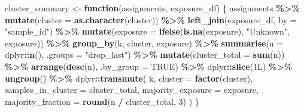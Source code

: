 \documentclass[
]{article}
\newenvironment{Shaded}{\begin{snugshade}}{\end{snugshade}}
\newcommand{\AttributeTok}[1]{\textcolor[rgb]{0.13,0.29,0.53}{#1}}
\newcommand{\ConstantTok}[1]{\textcolor[rgb]{0.56,0.35,0.01}{#1}}
\newcommand{\ControlFlowTok}[1]{\textcolor[rgb]{0.13,0.29,0.53}{\textbf{#1}}}
\newcommand{\DataTypeTok}[1]{\textcolor[rgb]{0.13,0.29,0.53}{#1}}
\newcommand{\DecValTok}[1]{\textcolor[rgb]{0.00,0.00,0.81}{#1}}
\newcommand{\FunctionTok}[1]{\textcolor[rgb]{0.13,0.29,0.53}{\textbf{#1}}}
\newcommand{\NormalTok}[1]{#1}
\newcommand{\OtherTok}[1]{\textcolor[rgb]{0.56,0.35,0.01}{#1}}
\newcommand{\SpecialCharTok}[1]{\textcolor[rgb]{0.81,0.36,0.00}{\textbf{#1}}}
\newcommand{\StringTok}[1]{\textcolor[rgb]{0.31,0.60,0.02}{#1}}
\begin{document}
\begin{Shaded}
\begin{Highlighting}[]
\NormalTok{cluster\_summary }\OtherTok{\textless{}{-}} \ControlFlowTok{function}\NormalTok{(assignments, exposure\_df) \{}
\NormalTok{    assignments }\SpecialCharTok{\%\textgreater{}\%}
        \FunctionTok{mutate}\NormalTok{(}\AttributeTok{cluster =} \FunctionTok{as.character}\NormalTok{(cluster)) }\SpecialCharTok{\%\textgreater{}\%}
        \FunctionTok{left\_join}\NormalTok{(exposure\_df, }\AttributeTok{by =} \StringTok{"sample\_id"}\NormalTok{) }\SpecialCharTok{\%\textgreater{}\%}
        \FunctionTok{mutate}\NormalTok{(}\AttributeTok{exposure =} \FunctionTok{ifelse}\NormalTok{(}\FunctionTok{is.na}\NormalTok{(exposure), }\StringTok{"Unknown"}\NormalTok{, exposure)) }\SpecialCharTok{\%\textgreater{}\%}
        \FunctionTok{group\_by}\NormalTok{(k, cluster, exposure) }\SpecialCharTok{\%\textgreater{}\%}
        \FunctionTok{summarise}\NormalTok{(}\AttributeTok{n =}\NormalTok{ dplyr}\SpecialCharTok{::}\FunctionTok{n}\NormalTok{(), }\AttributeTok{.groups =} \StringTok{"drop\_last"}\NormalTok{) }\SpecialCharTok{\%\textgreater{}\%}
        \FunctionTok{mutate}\NormalTok{(}\AttributeTok{cluster\_total =} \FunctionTok{sum}\NormalTok{(n)) }\SpecialCharTok{\%\textgreater{}\%}
        \FunctionTok{arrange}\NormalTok{(}\FunctionTok{desc}\NormalTok{(n), }\AttributeTok{.by\_group =} \ConstantTok{TRUE}\NormalTok{) }\SpecialCharTok{\%\textgreater{}\%}
\NormalTok{    dplyr}\SpecialCharTok{::}\FunctionTok{slice}\NormalTok{(}\DecValTok{1}\DataTypeTok{L}\NormalTok{) }\SpecialCharTok{\%\textgreater{}\%}
        \FunctionTok{ungroup}\NormalTok{() }\SpecialCharTok{\%\textgreater{}\%}
\NormalTok{    dplyr}\SpecialCharTok{::}\FunctionTok{transmute}\NormalTok{(}
\NormalTok{            k,}
            \AttributeTok{cluster =} \FunctionTok{factor}\NormalTok{(cluster),}
            \AttributeTok{samples\_in\_cluster =}\NormalTok{ cluster\_total,}
            \AttributeTok{majority\_exposure =}\NormalTok{ exposure,}
            \AttributeTok{majority\_fraction =} \FunctionTok{round}\NormalTok{(n }\SpecialCharTok{/}\NormalTok{ cluster\_total, }\DecValTok{3}\NormalTok{)}
\NormalTok{        )}
\NormalTok{\}}


\end{Highlighting}
\end{Shaded}
\end{document}
